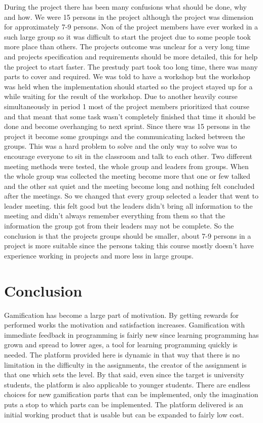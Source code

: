 During the project there has been many confusions what should be done, why and how. We were 15 persons in the project although the project was dimension for approximately 7-9 persons. Non of the project members have ever worked in a such large group so it was difficult to start the project due to some people took more place than others. The projects outcome was unclear for a very long time and projects specification and requirements should be more detailed, this for help the project to start faster. The prestudy part took too long time, there was many parts to cover and required. We was told to have a workshop but the workshop was held when the implementation should started so the project stayed up for a while waiting for the result of the workshop. Due to another heavily course simultaneously in period 1 most of the project members prioritized that course and that meant that some task wasn't completely finished that time it should be done and become overhanging to next sprint. 
Since there was 15 persons in the project it become some groupings and the communicating lacked between the groups. This was a hard problem to solve and the only way to solve was to encourage everyone to sit in the classroom and talk to each other. Two different meeting methods were tested, the whole group and leaders from groups. When the whole group was collected the meeting become more that one or few talked and the other sat quiet and the meeting become long and nothing felt concluded after the meetings. So we changed that every group selected a leader that went to leader meeting. this felt good but the leaders didn't bring all information to the meeting and didn't always remember everything from them so that the information the group got from their leaders may not be complete. So the conclusion is that the projects groups should be smaller, about 7-9 persons in a project is more suitable since the persons taking this course mostly doesn't have experience working in projects and more less in large groups.


\section{Conclusion}
Gamification has become a large part of motivation. By getting rewards for performed works the motivation and satisfaction increases. Gamification with immediate feedback in programming is fairly new since learning programming has grown and spread to lower ages, a tool for learning programming quickly is needed.  
The platform provided here is dynamic in that way that there is no limitation in the difficulty in the assignments, the creator of the assignment is that one which sets the level. By that said, even since the target is university students, the platform is also applicable to younger students. There are endless choices for new gamification parts that can be implemented, only the imagination puts a stop to which parts can be implemented. The platform delivered is an initial working product that is usable but can be expanded to fairly low cost. 

